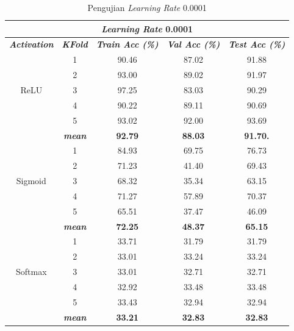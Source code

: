    
        \begin{table}[H]
        \centering
        \caption{Pengujian \textit{Learning Rate} 0.0001 }
        \begin{tabular}{ccccc}
            \toprule
            \multicolumn{5}{c}{\textit{Learning Rate} 0.0001} \\ \hline
            
            \textbf{\textit{Activation}} & \multicolumn{1}{c}{\textbf{\textit{KFold}}} & \textbf{\textit{Train Acc (\%)} } & \textbf{\textit{Val Acc (\%)}} & \textbf{\textit{Test Acc (\%)}}  \\
    
            \midrule
            \multirow{5}{*}{ReLU} 

            & 1 & 90.46 & 87.02 & 91.88 \\
            & 2 & 93.00 & 89.02 & 91.97 \\
            & 3 & 97.25 & 83.03 & 90.29 \\
            & 4 & 90.22 & 89.11 & 90.69 \\
            & 5 & 93.02 & 92.00 & 93.69 \\ 
            & \textit{\textbf{mean}}& \textbf{92.79} & \textbf{88.03} &\textbf{91.70.} \\ 
            \hline


            \multirow{5}{*}{Sigmoid}
            & 1 &  84.93 & 69.75 & 76.73  \\
            & 2 &  71.23 & 41.40 & 69.43 \\
            & 3 &  68.32 & 35.34 & 63.15 \\
            & 4 &  71.27 & 57.89 & 70.37 \\
            & 5 &  65.51 & 37.47 & 46.09 \\
            & \textit{\textbf{mean}}& \textbf{72.25} & \textbf{48.37} &\textbf{65.15} \\ 
                        \hline
    
            \multirow{5}{*}{Softmax}
            & 1 & 33.71 & 31.79 & 31.79 \\
            & 2 & 33.01 & 33.24 & 33.24 \\
            & 3 & 33.01 & 32.71 & 32.71  \\
            & 4 & 32.92 & 33.48 & 33.48 \\
            & 5 & 33.43 & 32.94 & 32.94 \\
            & \textit{\textbf{mean}}& \textbf{33.21} & \textbf{32.83} &\textbf{32.83} \\ 

            \bottomrule
        \end{tabular}
        \label{Pengujian Learning Rate 0.0001 }
    \end{table}

